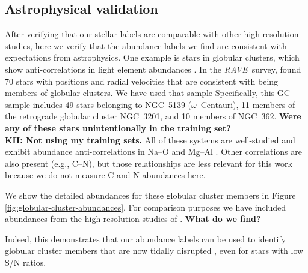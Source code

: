 \documentclass[preprint,trackchanges]{aastex}
\newcommand{\project}[1]{\textsl{#1}}
\newcommand{\rave}{\project{\acronym{RAVE}}}
\newcommand{\acronym}[1]{{\small{#1}}}
\newcommand{\stub}[1]{\textbf{#1}}
\begin{document}
\subsection{Astrophysical validation}

After verifying that our stellar labels are comparable with other
high-resolution studies, here we verify that the abundance labels we find
are consistent with expectations from astrophysics.  One example is stars in
globular clusters, which show anti-correlations in light element abundances 
\citep[e.g.,][and references therein]{Da_Costa,Carretta_2009}. In the \rave\
survey, \cite{Anguiano_2015} found 70 stars with positions and radial velocities that are
consistent with being members of globular clusters.  We have used that sample
Specifically, this GC sample includes 49 stars belonging to NGC~5139 ($\omega$~Centauri), 11 members of the retrograde
globular cluster NGC~3201, and 10 members of NGC~362.  
\stub{Were any of these stars unintentionally in the training set? \\ KH: Not using my training sets.}
All of these systems are well-studied and exhibit abundance anti-correlations 
in Na--O and Mg--Al \citep{people}.  Other correlations are also present 
(e.g., C--N), but those relationships are less relevant for this work because 
we do not measure C and N abundances here.


We show the detailed abundances for these globular cluster members in
Figure \ref{fig:globular-cluster-abundances}.  For comparison purposes we
have included abundances from the high-resolution studies of \citep{people}.
\stub{What do we find?}

Indeed, this demonstrates that our abundance labels can be used to identify
globular cluster members that are now tidally disrupted \citep{Anguiano_2016,Kuzma_2016,Navin_2016},
even for stars with low S/N ratios.

\end{document}
